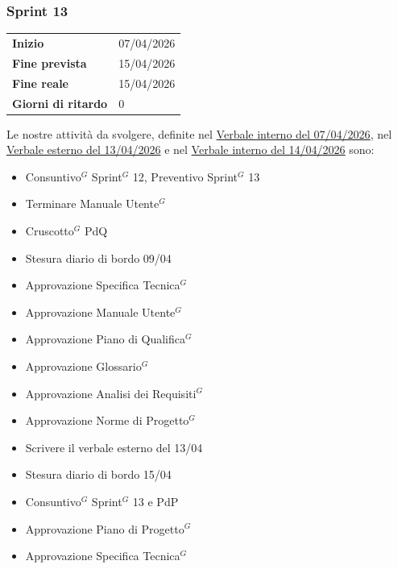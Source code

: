 \subsubsection{Sprint 13}


\begin{tabular}{p{} p{}}
	\textbf{Inizio} & 07/04/2026 \\
	\textbf{Fine prevista} & 15/04/2026 \\
	\textbf{Fine reale} & 15/04/2026 \\
	\textbf{Giorni di ritardo} & 0
\end{tabular}
\newline \newline 
Le nostre attività da svolgere, definite nel \href{https://nullpointersgroup.github.io/Documentazione/output/PB/Verbali%20Interni/2026-04-07_verbale_interno.pdf}{Verbale interno del 07/04/2026}, nel \href{https://nullpointersgroup.github.io/Documentazione/output/PB/Verbali%20Esterni/2026-04-13_verbale_esterno.pdf}{Verbale esterno del 13/04/2026} e nel \href{https://nullpointersgroup.github.io/Documentazione/output/PB/Verbali%20Interni/2026-04-14_verbale_interno.pdf}{Verbale interno del 14/04/2026} sono:
\begin{itemize}[itemsep=5pt, parsep=1pt, label=$\scriptstyle\bullet$]
	\item Consuntivo$^G$ Sprint$^G$ 12, Preventivo Sprint$^G$ 13
	\item Terminare Manuale Utente$^G$
	\item Cruscotto$^G$ PdQ
	\item Stesura diario di bordo 09/04
	\item Approvazione Specifica Tecnica$^G$
	\item Approvazione Manuale Utente$^G$
	\item Approvazione Piano di Qualifica$^G$
	\item Approvazione Glossario$^G$
	\item Approvazione Analisi dei Requisiti$^G$
	\item Approvazione Norme di Progetto$^G$
	\item Scrivere il verbale esterno del 13/04
	\item Stesura diario di bordo 15/04
	\item Consuntivo$^G$ Sprint$^G$ 13 e  PdP
	\item Approvazione Piano di Progetto$^G$
	\item Approvazione Specifica Tecnica$^G$
\end{itemize}

